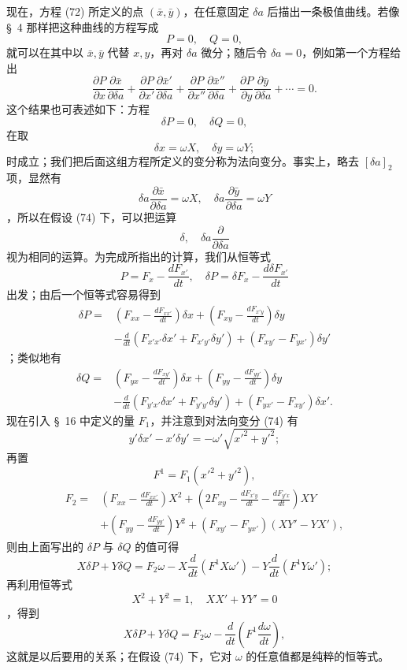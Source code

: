 \documentclass[11pt,a4paper,leqno]{article}
\begin{document}
现在，方程 (72) 所定义的点 $(\bar x,\bar y)$，在任意固定 $\delta a$ 后描出一条极值曲线。若像 \S~4 那样把这种曲线的方程写成
\[
P=0,\quad Q=0,
\]
就可以在其中以 $\bar x,\bar y$ 代替 $x,y$，再对 $\delta a$ 微分；随后令 $\delta a=0$，例如第一个方程给出
\[
\frac{\partial P}{\partial x}\frac{\partial\bar x}{\partial\delta a}
+\frac{\partial P}{\partial x'}\frac{\partial\bar x'}{\partial\delta a}
+\frac{\partial P}{\partial x''}\frac{\partial\bar x''}{\partial\delta a}
+\frac{\partial P}{\partial y}\frac{\partial\bar y}{\partial\delta a}+\cdots=0.
\]
这个结果也可表述如下：方程
\[
\delta P=0,\quad \delta Q=0,
\]
在取
\begin{equation}\tag{74}
\delta x=\omega X,
\quad
\delta y=\omega Y;
\end{equation}
时成立；我们把后面这组方程所定义的变分称为法向变分。事实上，略去 $[\delta a]_2$ 项，显然有
\[
\delta a\frac{\partial\bar x}{\partial\delta a}=\omega X,
\quad
\delta a\frac{\partial\bar y}{\partial\delta a}=\omega Y
\]
，所以在假设 (74) 下，可以把运算
\[
\delta,\quad \delta a\frac{\partial}{\partial\delta a}
\]
视为相同的运算。为完成所指出的计算，我们从恒等式
\[
P=F_x-\frac{dF_{x'}}{dt},\quad
\delta P=\delta F_x-\frac{d\delta F_{x'}}{dt}
\]
出发；由后一个恒等式容易得到
\[
\begin{aligned}
\delta P={}&\left(F_{xx}-\frac{dF_{xx'}}{dt}\right)\delta x
+\left(F_{xy}-\frac{dF_{x'y}}{dt}\right)\delta y\\
&-\frac{d}{dt}(F_{x'x'}\delta x'+F_{x'y'}\delta y')
+(F_{xy'}-F_{yx'})\delta y'
\end{aligned}
\]
；类似地有
\[
\begin{aligned}
\delta Q={}&\left(F_{yx}-\frac{dF_{xy'}}{dt}\right)\delta x
+\left(F_{yy}-\frac{dF_{yy'}}{dt}\right)\delta y\\
&-\frac{d}{dt}(F_{y'x'}\delta x'+F_{y'y'}\delta y')
+(F_{yx'}-F_{xy'})\delta x'.
\end{aligned}
\]
现在引入 \S~16 中定义的量 $F_1$，并注意到对法向变分 (74) 有
\[
y'\delta x'-x'\delta y'=-\omega'\sqrt{x'^2+y'^2};
\]
再置
\[
F^1=F_1(x'^2+y'^2),
\]
\[
\begin{aligned}
F_2={}&\left(F_{xx}-\frac{dF_{xx'}}{dt}\right)X^2
+\left(2F_{xy}-\frac{dF_{x'y}}{dt}-\frac{dF_{y'x}}{dt}\right)XY\\
&+\left(F_{yy}-\frac{dF_{yy'}}{dt}\right)Y^2
+(F_{xy'}-F_{yx'})(XY'-YX'),
\end{aligned}
\]
则由上面写出的 $\delta P$ 与 $\delta Q$ 的值可得
\[
X\delta P+Y\delta Q
=F_2\omega-X\frac{d}{dt}(F^1X\omega')-Y\frac{d}{dt}(F^1Y\omega');
\]
再利用恒等式
\[
X^2+Y^2=1,\quad XX'+YY'=0
\]
，得到
\begin{equation}\tag{75}
X\delta P+Y\delta Q=F_2\omega-\frac{d}{dt}\left(F^1\frac{d\omega}{dt}\right),
\end{equation}
这就是以后要用的关系；在假设 (74) 下，它对 $\omega$ 的任意值都是纯粹的恒等式。
\end{document}
